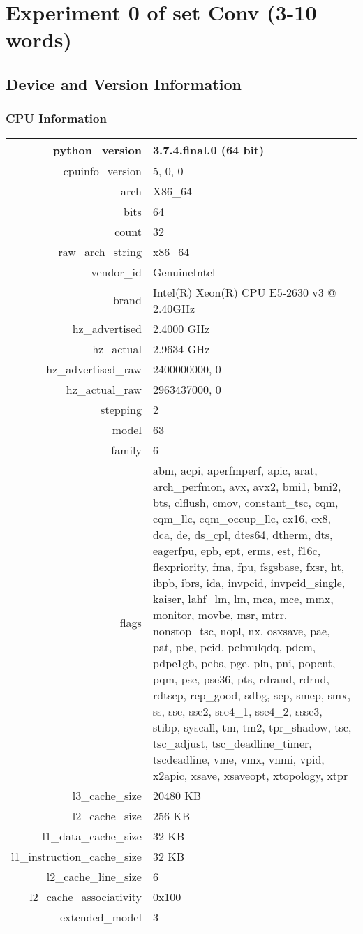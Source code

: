 \documentclass{article}%
\begin{document}
%
\normalsize%
\section{Experiment 0 of set Conv (3{-}10 words)}%
\label{sec:Experiment 0 of set Conv (3{-}10 words)}%
\subsection{Device and Version Information}%
\label{subsec:Device and Version Information}%
\subsubsection{CPU Information}%
\label{ssubsec:CPU Information}%
\begin{tabular}{|r|p{8cm}|}%
\hline%
python\_version&3.7.4.final.0 (64 bit)\\%
\hline%
cpuinfo\_version&5, 0, 0\\%
\hline%
arch&X86\_64\\%
\hline%
bits&64\\%
\hline%
count&32\\%
\hline%
raw\_arch\_string&x86\_64\\%
\hline%
vendor\_id&GenuineIntel\\%
\hline%
brand&Intel(R) Xeon(R) CPU E5{-}2630 v3 @ 2.40GHz\\%
\hline%
hz\_advertised&2.4000 GHz\\%
\hline%
hz\_actual&2.9634 GHz\\%
\hline%
hz\_advertised\_raw&2400000000, 0\\%
\hline%
hz\_actual\_raw&2963437000, 0\\%
\hline%
stepping&2\\%
\hline%
model&63\\%
\hline%
family&6\\%
\hline%
flags&abm, acpi, aperfmperf, apic, arat, arch\_perfmon, avx, avx2, bmi1, bmi2, bts, clflush, cmov, constant\_tsc, cqm, cqm\_llc, cqm\_occup\_llc, cx16, cx8, dca, de, ds\_cpl, dtes64, dtherm, dts, eagerfpu, epb, ept, erms, est, f16c, flexpriority, fma, fpu, fsgsbase, fxsr, ht, ibpb, ibrs, ida, invpcid, invpcid\_single, kaiser, lahf\_lm, lm, mca, mce, mmx, monitor, movbe, msr, mtrr, nonstop\_tsc, nopl, nx, osxsave, pae, pat, pbe, pcid, pclmulqdq, pdcm, pdpe1gb, pebs, pge, pln, pni, popcnt, pqm, pse, pse36, pts, rdrand, rdrnd, rdtscp, rep\_good, sdbg, sep, smep, smx, ss, sse, sse2, sse4\_1, sse4\_2, ssse3, stibp, syscall, tm, tm2, tpr\_shadow, tsc, tsc\_adjust, tsc\_deadline\_timer, tscdeadline, vme, vmx, vnmi, vpid, x2apic, xsave, xsaveopt, xtopology, xtpr\\%
\hline%
l3\_cache\_size&20480 KB\\%
\hline%
l2\_cache\_size&256 KB\\%
\hline%
l1\_data\_cache\_size&32 KB\\%
\hline%
l1\_instruction\_cache\_size&32 KB\\%
\hline%
l2\_cache\_line\_size&6\\%
\hline%
l2\_cache\_associativity&0x100\\%
\hline%
extended\_model&3\\%
\hline%
\end{tabular}
\end{document}
